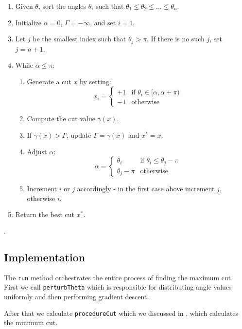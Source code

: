 \begin{enumerate}
    \item Given \(\theta\), sort the angles \(\theta_i\) such that \(\theta_1 \leq \theta_2 \leq \ldots \leq \theta_n\).
    \item Initialize \(\alpha = 0\), \(\Gamma = -\infty\), and set \(i = 1\).
    \item Let \(j\) be the smallest index such that \(\theta_j > \pi\). If there is no such \(j\), set \(j = n + 1\).
    \item While \(\alpha \leq \pi\):
    \begin{enumerate}
        \item Generate a cut \(x\) by setting:
        \[
        x_i = \begin{cases} 
        +1 & \text{if } \theta_i \in [\alpha, \alpha + \pi) \\
        -1 & \text{otherwise}
        \end{cases}
        \]
        \item Compute the cut value \(\gamma(x)\).
        \item If \(\gamma(x) > \Gamma\), update \(\Gamma = \gamma(x)\) and \(x^* = x\).
        \item Adjust \(\alpha\):
        \[
        \alpha = \begin{cases} 
        \theta_i & \text{if } \theta_i \leq \theta_j - \pi \\
        \theta_j - \pi & \text{otherwise}
        \end{cases}
        \]
        \item Increment \(i\) or \(j\) accordingly - in the first case above increment \(j\), otherwise \(i\).
    \end{enumerate}
    \item Return the best cut \(x^*\).
\end{enumerate}.



\subsection{Implementation}

The \texttt{run} method orchestrates the entire process of finding the maximum cut. First we call \texttt{perturbTheta} which is responsible for distributing angle values uniformly and then performing gradient descent.

After that we calculate \texttt{procedureCut} which we discussed in , which calculates the minimum cut.


